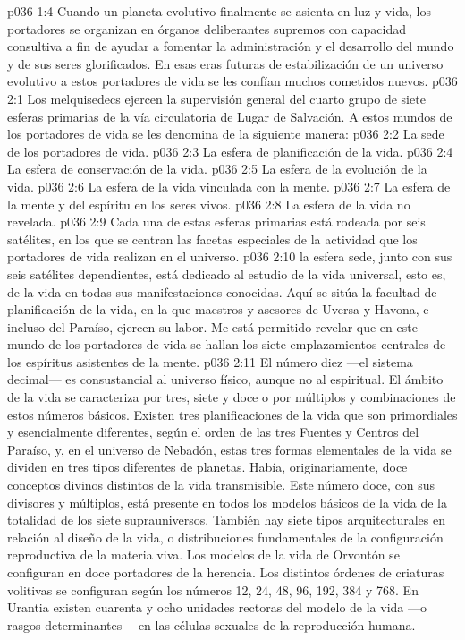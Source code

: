 \vs p036 1:4 Cuando un planeta evolutivo finalmente se asienta en luz y vida, los portadores se organizan en órganos deliberantes supremos con capacidad consultiva a fin de ayudar a fomentar la administración y el desarrollo del mundo y de sus seres glorificados. En esas eras futuras de estabilización de un universo evolutivo a estos portadores de vida se les confían muchos cometidos nuevos.
\vs p036 2:1 Los melquisedecs ejercen la supervisión general del cuarto grupo de siete esferas primarias de la vía circulatoria de Lugar de Salvación. A estos mundos de los portadores de vida se les denomina de la siguiente manera:
\vs p036 2:2 La sede de los portadores de vida.
\vs p036 2:3 La esfera de planificación de la vida.
\vs p036 2:4 La esfera de conservación de la vida.
\vs p036 2:5 La esfera de la evolución de la vida.
\vs p036 2:6 La esfera de la vida vinculada con la mente.
\vs p036 2:7 La esfera de la mente y del espíritu en los seres vivos.
\vs p036 2:8 La esfera de la vida no revelada.
\vs p036 2:9 \pc Cada una de estas esferas primarias está rodeada por seis satélites, en los que se centran las facetas especiales de la actividad que los portadores de vida realizan en el universo.
\vs p036 2:10 \pc {} la esfera sede, junto con sus seis satélites dependientes, está dedicado al estudio de la vida universal, esto es, de la vida en todas sus manifestaciones conocidas. Aquí se sitúa la facultad de planificación de la vida, en la que maestros y asesores de Uversa y Havona, e incluso del Paraíso, ejercen su labor. Me está permitido revelar que en este mundo de los portadores de vida se hallan los siete emplazamientos centrales de los espíritus asistentes de la mente.
\vs p036 2:11 El número diez ---el sistema decimal--- es consustancial al universo físico, aunque no al espiritual. El ámbito de la vida se caracteriza por tres, siete y doce o por múltiplos y combinaciones de estos números básicos. Existen tres planificaciones de la vida que son primordiales y esencialmente diferentes, según el orden de las tres Fuentes y Centros del Paraíso, y, en el universo de Nebadón, estas tres formas elementales de la vida se dividen en tres tipos diferentes de planetas. Había, originariamente, doce conceptos divinos distintos de la vida transmisible. Este número doce, con sus divisores y múltiplos, está presente en todos los modelos básicos de la vida de la totalidad de los siete suprauniversos. También hay siete tipos arquitecturales en relación al diseño de la vida, o distribuciones fundamentales de la configuración reproductiva de la materia viva. Los modelos de la vida de Orvontón se configuran en doce portadores de la herencia. Los distintos órdenes de criaturas volitivas se configuran según los números 12, 24, 48, 96, 192, 384 y 768. En Urantia existen cuarenta y ocho unidades rectoras del modelo de la vida ---o rasgos determinantes--- en las células sexuales de la reproducción humana.
